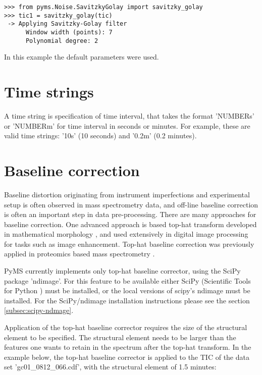 \begin{verbatim}
>>> from pyms.Noise.SavitzkyGolay import savitzky_golay
>>> tic1 = savitzky_golay(tic)
 -> Applying Savitzky-Golay filter
      Window width (points): 7
      Polynomial degree: 2
\end{verbatim}

In this example the default parameters were used.

\section{Time strings}
\label{sec:time-string}

A time string is specification of time interval, that takes the format
'NUMBERs' or 'NUMBERm' for time interval in seconds or minutes. For
example, these are valid time strings: '10s' (10 seconds) and '0.2m'
(0.2 minutes).

\section{Baseline correction}


Baseline distortion originating from instrument imperfections and
experimental setup is often observed in mass spectrometry data,
and off-line baseline correction is often an important step in
data pre-processing. There are many approaches for baseline
correction. One advanced approach is based top-hat transform
developed in mathematical morphology \cite{serra83}, and used
extensively in digital image processing for tasks such as image
enhancement. Top-hat baseline correction was previously applied
in proteomics based mass spectrometry \cite{sauve04}.

PyMS currently implements only top-hat baseline corrector, using
the SciPy package 'ndimage'. For this feature to be available either
SciPy (Scientific Tools for Python \cite{scipy}) must be installed,
or the local versions of scipy's ndimage must be installed. For
the SciPy/ndimage installation instructions please see the section
\ref{subsec:scipy-ndmage}.

Application of the top-hat baseline corrector requires the size
of the structural element to be specified. The structural element
needs to be larger than the features one wants to retain in the
spectrum after the top-hat transform. In the example below, the
top-hat baseline corrector is applied to the TIC of the data set
'gc01\_0812\_066.cdf', with the structural element of 1.5 minutes:


